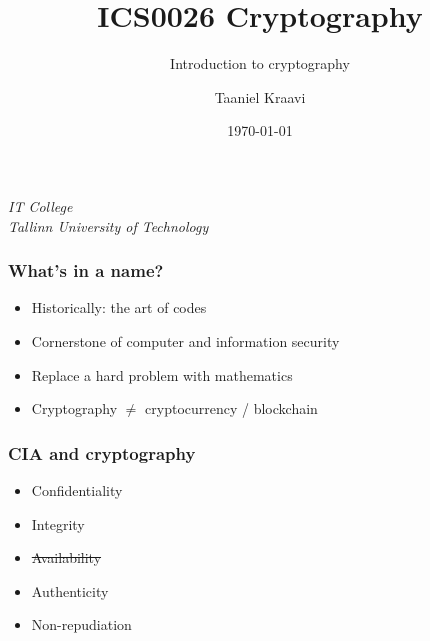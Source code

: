\usepackage{soul}

\title{ICS0026 Cryptography}
\subtitle{Introduction to cryptography}
\date{\today}
\author{Taaniel Kraavi}
\institute%
{%
  \textit{IT College}\\
  \textit{Tallinn University of Technology}
}


\begin{frame}
  \titlepage
\end{frame}

\begin{frame}
  \frametitle{What's in a name?}

  \pause
  \begin{itemize}[<+->]
    \item Historically: the art of codes
    \item Cornerstone of computer and information security
    \item Replace a hard problem with mathematics
    \item Cryptography $\neq$ cryptocurrency / blockchain
  \end{itemize}
\end{frame}

\begin{frame}
  \frametitle{CIA and cryptography}

  \pause
  \begin{itemize}[<+(1)->]
    \item Confidentiality
    \item Integrity
    \item \st{Availability}
    \pause
    \item Authenticity
    \item Non-repudiation
  \end{itemize}
\end{frame}

